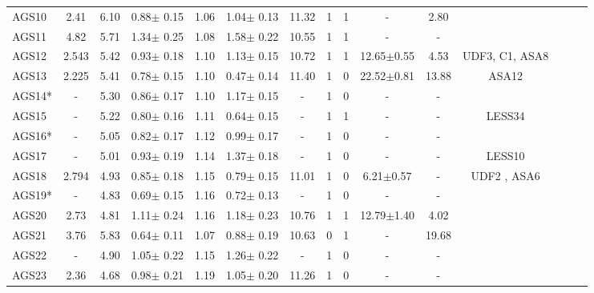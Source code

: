 \documentclass[longauth]{aa}
\begin{document}
\begin{table*}
\begin{tabular}{l  c c c c c c c c c c c c c c }
AGS10  	&  2.41 	&6.10 	& 0.88$\pm$ 0.15 		&1.06& 1.04$\pm$ 0.13 & 11.32 	&  1 & 1 & -  				& 2.80 	&			\\
AGS11  	&  4.82 	&5.71 	& 1.34$\pm$ 0.25 		&1.08& 1.58$\pm$ 0.22 & 10.55 	&  1 & 1 & -  				& - 		&			\\
AGS12  	&  2.543 	&5.42 	& 0.93$\pm$ 0.18 		&1.10& 1.13$\pm$ 0.15 & 10.72 	&  1 & 1 & 12.65$\pm$0.55 	& 4.53 	& UDF3, C1, ASA8       \\
AGS13   	&  2.225 	&5.41 	& 0.78$\pm$ 0.15 		&1.10& 0.47$\pm$ 0.14 & 11.40 	&  1 & 0 & 22.52$\pm$0.81 	& 13.88 	&     ASA12	\\
AGS14* 	&  -   	&5.30 	& 0.86$\pm$ 0.17 		&1.10& 1.17$\pm$ 0.15 &  -   	 	&  1 & 0 & -  				& - 		&			\\
AGS15   	&  -  		&5.22 	& 0.80$\pm$ 0.16 		&1.11& 0.64$\pm$ 0.15 &  - 	 	&  1 & 1 & -  				& - 		&LESS34		\\
AGS16*  	&  -   	&5.05 	& 0.82$\pm$ 0.17 		&1.12& 0.99$\pm$ 0.17 &  -   		&  1 & 0 & -  				& - 		&			\\
AGS17  	&  -  		&5.01 	& 0.93$\pm$ 0.19\dag 	& 1.14&1.37$\pm$ 0.18 &  - 		&  1 & 0 & -  				& - 		&   LESS10	\\
AGS18   	&  2.794 	&4.93 	& 0.85$\pm$ 0.18\dag 	&1.15& 0.79$\pm$ 0.15 & 11.01 	&  1 & 0 & 6.21$\pm$0.57 	& - 		& UDF2 , ASA6 \\
AGS19*  	&  -  		&4.83 	& 0.69$\pm$ 0.15 		&1.16& 0.72$\pm$ 0.13 &  - 		&  1 & 0 & -  				& - 		&			\\
AGS20   	&  2.73 	&4.81 	& 1.11$\pm$ 0.24 		&1.16& 1.18$\pm$ 0.23 & 10.76 	&  1 & 1 & 12.79$\pm$1.40 	& 4.02 	&			\\
\hline      
AGS21  	&  3.76 	&5.83 	& 0.64$\pm$ 0.11 		&1.07& 0.88$\pm$ 0.19 & 10.63 	&  0 & 1 & -  				& 19.68 	&			\\
AGS22  	&   -   	&4.90 	& 1.05$\pm$ 0.22 		&1.15& 1.26$\pm$ 0.22 &   -   		&  1 & 0 & - 				& - 		&			\\
AGS23  	&  2.36 	&4.68 	& 0.98$\pm$ 0.21 		&1.19& 1.05$\pm$ 0.20 & 11.26 	&  1 & 0 & -  				& - 		&			\\
\hline                       
\end{tabular}

\end{table*}
\end{document}
